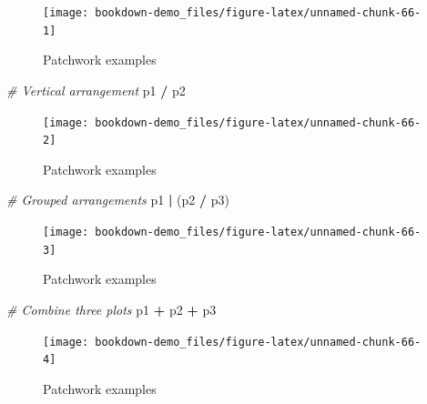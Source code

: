 \documentclass[]{book}
\newenvironment{Shaded}{\begin{snugshade}}{\end{snugshade}}
\newcommand{\StringTok}[1]{\textcolor[rgb]{0.31,0.60,0.02}{#1}}
\newcommand{\CommentTok}[1]{\textcolor[rgb]{0.56,0.35,0.01}{\textit{#1}}}
\newcommand{\OperatorTok}[1]{\textcolor[rgb]{0.81,0.36,0.00}{\textbf{#1}}}
\newcommand{\NormalTok}[1]{#1}
\begin{document}
\begin{figure}

{\centering \texttt{[image: bookdown-demo\_files/figure-latex/unnamed-chunk-66-1]} 

}

\caption{Patchwork examples}\label{fig:unnamed-chunk-66-1}
\end{figure}

\begin{Shaded}
\begin{Highlighting}[]
\CommentTok{# Vertical arrangement}
\NormalTok{p1 }\OperatorTok{/}\StringTok{ }\NormalTok{p2}
\end{Highlighting}
\end{Shaded}

\begin{figure}

{\centering \texttt{[image: bookdown-demo\_files/figure-latex/unnamed-chunk-66-2]} 

}

\caption{Patchwork examples}\label{fig:unnamed-chunk-66-2}
\end{figure}

\begin{Shaded}
\begin{Highlighting}[]
\CommentTok{# Grouped arrangements}
\NormalTok{p1 }\OperatorTok{|}\StringTok{ }\NormalTok{(p2 }\OperatorTok{/}\StringTok{ }\NormalTok{p3)}
\end{Highlighting}
\end{Shaded}

\begin{figure}

{\centering \texttt{[image: bookdown-demo\_files/figure-latex/unnamed-chunk-66-3]} 

}

\caption{Patchwork examples}\label{fig:unnamed-chunk-66-3}
\end{figure}

\begin{Shaded}
\begin{Highlighting}[]
\CommentTok{# Combine three plots}
\NormalTok{p1 }\OperatorTok{+}\StringTok{ }\NormalTok{p2 }\OperatorTok{+}\StringTok{ }\NormalTok{p3 }
\end{Highlighting}
\end{Shaded}

\begin{figure}

{\centering \texttt{[image: bookdown-demo\_files/figure-latex/unnamed-chunk-66-4]} 

}

\caption{Patchwork examples}\label{fig:unnamed-chunk-66-4}
\end{figure}
\end{document}
